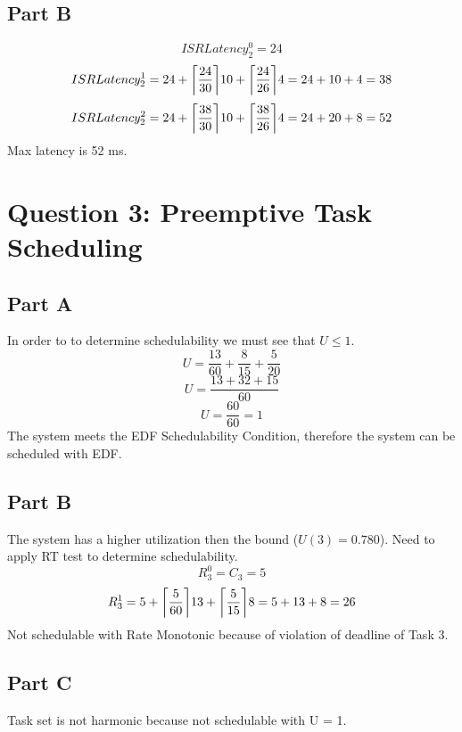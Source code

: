 \documentclass{article}
\DeclarePairedDelimiter\ceil{\lceil}{\rceil}
\begin{document}
	\subsection*{Part B}
	$$ ISRLatency_2^0 = 24 $$
	$$ ISRLatency_2^1 = 24 + \ceil*{\frac{24}{30}}10+\ceil*{\frac{24}{26}}4=24+10+4=38$$
	$$ ISRLatency_2^2 = 24 + \ceil*{\frac{38}{30}}10+\ceil*{\frac{38}{26}}4=24+20+8=52$$
	Max latency is 52 ms.
	\section*{Question 3: Preemptive Task Scheduling}
	\subsection*{Part A}
	In order to to determine schedulability we must see that $ U \leq 1 $.
	$$ U = \frac{13}{60} + \frac{8}{15}+\frac{5}{20}$$
	$$ U = \frac{13+32+15}{60}$$
	$$ U = \frac{60}{60} = 1$$
	The system meets the EDF Schedulability Condition, therefore the system can be scheduled with EDF.
	\subsection*{Part B}
	The system has a higher utilization then the bound ($U(3) = 0.780$). Need to apply RT test to determine schedulability.
	$$R_3^0=C_3=5$$
	$$R_3^1=5+\ceil*{\frac{5}{60}}13+\ceil*{\frac{5}{15}}8=5+13+8=26$$
	Not schedulable with Rate Monotonic because of violation of deadline of Task 3.
	\subsection*{Part C}
	Task set is not harmonic because not schedulable with U = 1.
\end{document}
